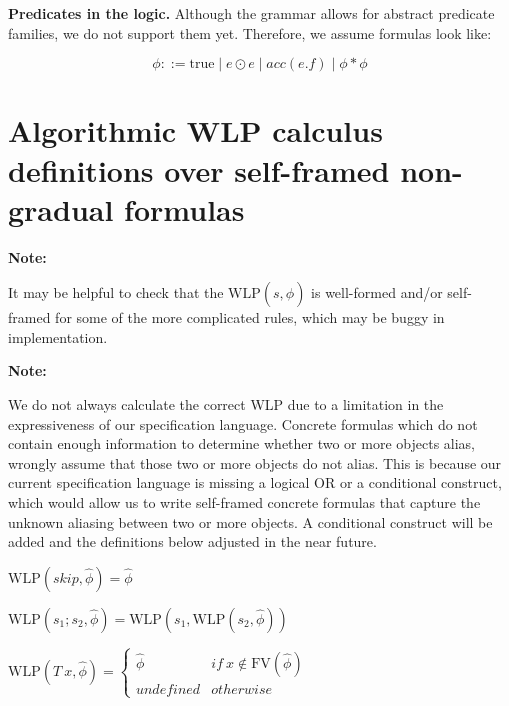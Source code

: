\documentclass {article}
\newcommand{\true}{\text{true}}
\newcommand{\fphi}{\widehat{\phi}}
\newcommand{\wlp}[2]{\text{WLP}(#1,#2)}
\begin{document}
\textbf{Predicates in the logic.} Although the grammar allows for abstract predicate families, we do not support them yet. Therefore, we assume formulas look like:

$$ \phi ::= \true \mid e \odot e \mid acc(e.f) \mid \phi \ast \phi $$

\section{Algorithmic WLP calculus definitions over self-framed non-gradual formulas}
\hspace{0.5cm}

\textbf{Note:} 

It may be helpful to check that the $\wlp{s}{\fphi}$ is well-formed and/or self-framed for some of the more complicated rules, which may be buggy in implementation.

\vspace{0.5cm}

\textbf{Note:}

We do not always calculate the correct WLP due to a limitation in the expressiveness of our specification language. Concrete formulas which do not contain enough information to determine whether two or more objects alias, wrongly assume that those two or more objects do not alias. This is because our current specification language is missing a logical OR or a conditional construct, which would allow us to write self-framed concrete formulas that capture the unknown aliasing between two or more objects. A conditional construct will be added and the definitions below adjusted in the near future.

\vspace{0.5cm}

$\wlp{skip}{\fphi} = \fphi  $

\vspace{0.5cm}

$\wlp{s_1;s_2}{\fphi} = \wlp{s_1}{\wlp{s_2}{\fphi}} $

\vspace{0.5cm}

$\wlp{T\ x}{\fphi} = \begin{cases}
  \fphi & if\ x \not\in \text{FV}(\fphi) \\
  undefined & otherwise
\end{cases}$
\end{document}
